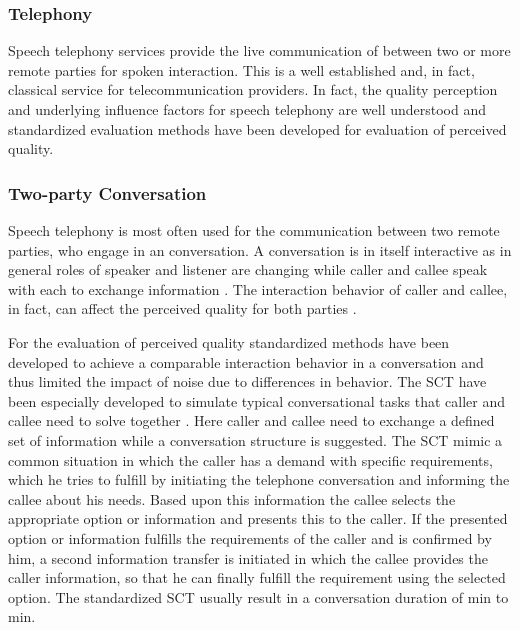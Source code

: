 

\subsubsection*{Telephony}
Speech telephony services provide the live communication of between two or more remote parties for spoken interaction.
This is a well established and, in fact, classical service for telecommunication providers.
In fact, the quality perception and underlying influence factors for speech telephony are well understood and standardized evaluation methods have been developed for evaluation of perceived quality.

\subsubsection*{Two-party Conversation}
Speech telephony is most often used for the communication between two remote parties, who engage in an conversation.
A conversation is in itself interactive as in general roles of speaker and listener are changing while caller and callee speak with each to exchange information \citet[\eg,][]{hopper_telephone_2002}.%
The interaction behavior of caller and callee, in fact, can affect the perceived quality for both parties \citep[\cf,][]{schoenenberg_why_2014}.

For the evaluation of perceived quality standardized methods have been developed to achieve a comparable interaction behavior in a conversation and thus limited the impact of noise due to differences in behavior.
The \acf{SCT} have been especially developed to simulate typical conversational tasks that caller and callee need to solve together \cite[\cf,][p. 76]{moller_assessment_2000}.
Here caller and callee need to exchange a defined set of information while a conversation structure is suggested.
The \acs{SCT} mimic a common situation in which the caller has a demand with specific requirements, which he tries to fulfill by initiating the telephone conversation and informing the callee about his needs.
Based upon this information the callee selects the appropriate option or information and presents this to the caller.
If the presented option or information fulfills the requirements of the caller and is confirmed by him, a second information transfer is initiated in which the callee provides the caller information, so that he can finally fulfill the requirement using the selected option.
The standardized \acs{SCT} \citep{itu-t_p.805:_2007} usually result in a conversation duration of \unit[3]{min} to \unit[7]{min}.

